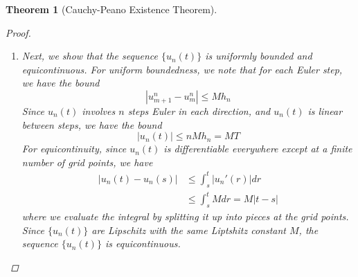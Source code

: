 \documentclass[10pt]{article}         %
\newtheorem{theorem}{Theorem}[section]
\theoremstyle{remark}
\begin{document}
\begin{theorem}[Cauchy-Peano Existence Theorem]
\begin{proof}
\begin{enumerate}
    \begin{enumerate}
        \item Take $h_n = T/n$ be the grid mesh size, so that the grid for $t$ is given by
        \[
        [-t_n^n, -t_{n-1}^n, \dots, -t_1^n, 0, t_1^n, t_2^n, \dots, t_n^n] = [-n h_n, -(n-1)h_n, \dots, -h_n, 0, h_n, 2 h_n, \dots, n h_n ] 
        \]
        which contains $2n + 1$ grid points, and $n h_n = T$.
        \item We start with initial condition $u_0^n = 0$, then compute $u_n$ on the rest of the grid using the forward Euler method.
        \begin{align*}
            u_0^n &= 0 \\
            u_1^n &=  0 + f(0, 0) h_n \\
            u_2^n &=  u_1^n + f(t_1^n, u_1^n) h_n \\
            & \vdots \\
            u_{m+1}^n &= u_m^n + f(t_m^n, u_m^n) h_n
        \end{align*}
        and similarly for going backwards. 
        \item $u_n(t)$ is the piecewise linear interpolation of these grid values. Since $u_n(t)$ is piecewise linear, $u_n(t)$ is differentiable on the interval $[t_m^n, t_{m+1}^n]$ with
        \[
        u_n'(t) = f(t_m^n, u_m^n)
        \]
        thus on each interval, $|u_n'(t)| \leq M$.
    \end{enumerate}
    
    \item Next, we show that the sequence $\{ u_n(t) \}$ is uniformly bounded and equicontinuous. For uniform boundedness, we note that for each Euler step, we have the bound
    \[
    |u_{m+1}^n - u_m^n| \leq M h_n
    \]
    Since $u_n(t)$ involves $n$ steps Euler in each direction, and $u_n(t)$ is linear between steps, we have the bound
    \[
    |u_n(t)| \leq n M h_n = M T
    \]
    For equicontinuity, since $u_n(t)$ is differentiable everywhere except at a finite number of grid points, we have
    \begin{align*}
        |u_n(t) - u_n(s)| &\leq \int_s^t |u_n'(r)| dr \\
        &\leq \int_s^t M dr = M|t-s|
    \end{align*}
    where we evaluate the integral by splitting it up into pieces at the grid points. Since $\{u_n(t) \}$ are Lipschitz with the same Liptshitz constant $M$, the sequence $\{ u_n(t) \}$ is equicontinuous. 
    

\end{enumerate}
\end{proof}
\end{theorem}
\end{document}
